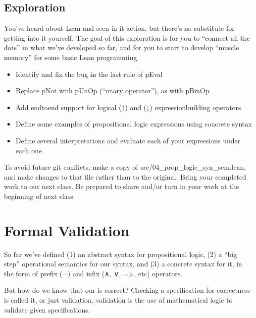 \documentclass[letterpaper,10pt,english]{sphinxmanual}
\begin{document}
\subsection{Exploration}
\label{\detokenize{A_01_Propositional_Logic:exploration}}
\sphinxAtStartPar
You’ve heard about Lean and seen in it action, but there’s no substitute for
getting into it yourself. The goal of this exploration is for you to “connect
all the dots” in what we’ve developed so far, and for you to start to develop
“muscle memory” for some basic Lean programming.
\begin{itemize}
\item {} 
\sphinxAtStartPar
Identify and fix the bug in the last rule of pEval

\item {} 
\sphinxAtStartPar
Replace pNot with pUnOp (“unary operator”), as with pBinOp

\item {} 
\sphinxAtStartPar
Add end\sphinxhyphen{}to\sphinxhyphen{}end support for logical  (↑) and  (↓) expression\sphinxhyphen{}building operators

\item {} 
\sphinxAtStartPar
Define some examples of propositional logic expressions using concrete syntax

\item {} 
\sphinxAtStartPar
Define several interpretations and evaluate each of your expressions under each one

\end{itemize}

\sphinxAtStartPar
To avoid future git conflicts, make a copy of src/04\_prop\_logic\_syn\_sem.lean, and
make changes to that file rather than to the original. Bring your completed work
to our next class. Be prepared to share and/or turn in your work at the beginning
of next class.


\section{Formal Validation}
\label{\detokenize{A_01_Propositional_Logic:formal-validation}}
\sphinxAtStartPar
So far we’ve defined (1) an abstract syntax for propositional
logic, (2) a “big step” operational semantics for our syntax,
and (3) a concrete syntax for it, in the form of prefix (¬) and
infix (∧, ∨, =>, etc) operators.

\sphinxAtStartPar
But how do we know that our  is correct? Checking
a specification for correctness is called  it, or just
validation.  validation is the use of mathematical logic
to validate given specifications.
\end{document}
